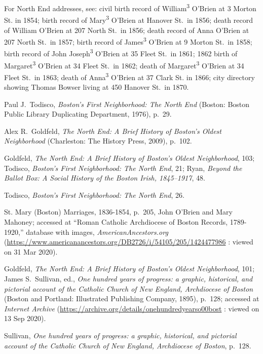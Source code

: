 \begin{thebibliography}{999}
For North End addresses, see: civil birth record of William\textsuperscript{3} O'Brien at 3 Morton St. in 1854; birth record of Mary\textsuperscript{3} O'Brien at Hanover St.\ in 1856; death record of William O'Brien at 207 North St.\ in 1856; death record of Anna O'Brien at 207 North St.\ in 1857; birth record of James\textsuperscript{3} O'Brien at 9 Morton St.\ in 1858; birth record of John Joseph\textsuperscript{3} O'Brien at 35 Fleet St.\ in 1861; 1862 birth of Margaret\textsuperscript{3} O'Brien at 34 Fleet St.\ in 1862; death of Margaret\textsuperscript{3}  O'Brien at 34 Fleet St.\ in 1863; death of Anna\textsuperscript{3} O'Brien at 37 Clark St. in 1866; city directory showing Thomas Bowser living at 450 Hanover St.\ in 1870.

Paul J.\ Todisco, \textit{Boston's First Neighborhood: The North End} (Boston: Boston Public Library Duplicating Department, 1976), p.\ 29.

Alex R.\ Goldfeld, \textit{The North End: A Brief History of Boston's Oldest Neighborhood} (Charleston: The History Press, 2009), p.\ 102.

Goldfeld, \textit{The North End: A Brief History of Boston's Oldest Neighborhood}, 103; Todisco, \textit{Boston's First Neighborhood: The North End}, 21; Ryan, \textit{Beyond the Ballot Box: A Social History of the Boston Irish, 1845--1917}, 48.

Todisco, \textit{Boston's First Neighborhood: The North End}, 26.

St. Mary (Boston) Marriages, 1836-1854, p.\ 205, John O'Brien and Mary Mahoney; accessed at ``Roman Catholic Archdiocese of Boston Records, 1789-1920,'' database with images, \textit{AmericanAncestors.org} (\url{https://www.americanancestors.org/DB2726/i/54105/205/1424477986} : viewed on 31 Mar 2020).

Goldfeld, \textit{The North End: A Brief History of Boston's Oldest Neighborhood}, 101; James S.\ Sullivan, ed., \textit{One hundred years of progress: a graphic, historical, and pictorial account of the Catholic Church of New England, Archdiocese of Boston} (Boston and Portland: Illustrated Publishing Company, 1895), p.\ 128; accessed at \textit{Internet Archive} (\url{https://archive.org/details/onehundredyearso00bost} : viewed on 13 Sep 2020).

Sullivan, \textit{One hundred years of progress: a graphic, historical, and pictorial account of the Catholic Church of New England, Archdiocese of Boston}, p.\ 128.


\end{thebibliography}
